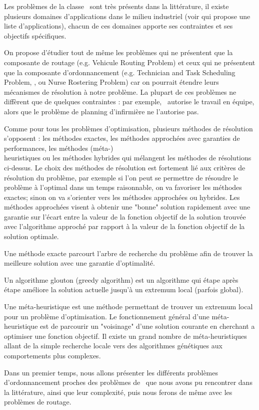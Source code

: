 \label{sec:SOA_AppAct}
Les problèmes de la classe \wsrp ~sont très présents dans la littérature, il existe plusieurs domaines d'applications dans le milieu industriel (voir \cite{Castillo2016} qui propose une liste d'applications), chacun de ces domaines apporte ses contraintes et ses objectifs spécifiques. 

On propose d'étudier tout de même les problèmes qui ne présentent que la composante de routage (e.g. Vehicule Routing Problem) et ceux qui ne présentent que la composante d'ordonnancement (e.g. Technician and Task Scheduling Problem, \ttsp, ou Nurse Rostering Problem) car on pourrait étendre leurs mécanismes de résolution à notre problème. La plupart de ces problèmes ne diffèrent que de quelques contraintes : par exemple, \ttsp ~autorise le travail en équipe, alors que le problème de planning d'infirmière ne l'autorise pas. 

Comme pour tous les problèmes d'optimisation, plusieurs méthodes de résolution s'opposent : les méthodes exactes, les méthodes approchées avec garanties de performances, les méthodes \mbox{(méta-)}\\heuristiques ou les méthodes hybrides qui mélangent les méthodes de résolutions ci-dessus. 
Le choix des méthodes de résolution est fortement lié aux critères de résolution du problème, par exemple si l'on peut se permettre de résoudre le problème à l'optimal dans un temps raisonnable, on va favoriser les méthodes exactes; sinon on va s'orienter vers les méthodes approchées ou hybrides.
Les méthodes approchées visent à obtenir une "bonne" solution rapidement avec une garantie sur l'écart entre la valeur de la fonction objectif de la solution trouvée avec l'algorithme approché par rapport à la valeur de la fonction objectif de la solution optimale.
\begin{mydef}
\label{def:exact}
Une méthode exacte parcourt l'arbre de recherche du problème afin de trouver la meilleure solution avec une garantie d'optimalité.
\end{mydef}
\begin{mydef}
\label{def:greedy}
Un algorithme glouton (greedy algorithm) est un algorithme qui étape après étape améliore la solution actuelle jusqu'à un extremum local (parfois global). 
\end{mydef}
\begin{mydef}
\label{def:metaheuristic}
Une méta-heuristique est une méthode permettant de trouver un extremum local pour un problème d'optimisation. Le fonctionnement général d'une méta-heuristique est de parcourir un "voisinage" d'une solution courante en cherchant a optimiser une fonction objectif. Il existe un grand nombre de méta-heuristiques allant de la simple recherche locale vers des algorithmes génétiques aux comportements plus complexes.
\end{mydef}

Dans un premier temps, nous allons présenter les différents problèmes d'ordonnancement proches des problèmes de \wsrp ~que nous avons pu rencontrer dans la littérature, ainsi que leur complexité, puis nous ferons de même avec les problèmes de routage.

